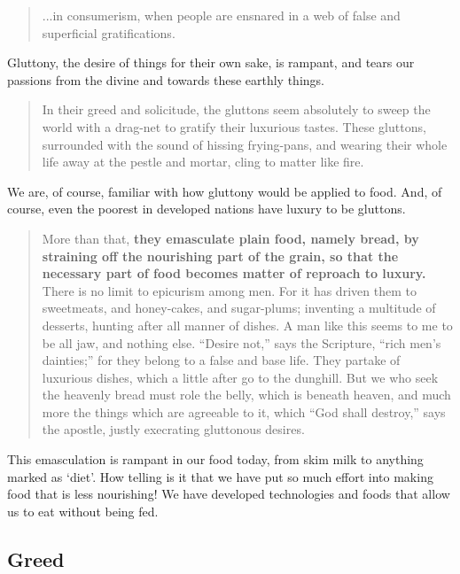 \documentclass[letterpaper]{article}
\begin{document}
\begin{quote}
  ...in consumerism, when people are ensnared in a web of false and superficial gratifications.
\end{quote}

Gluttony, the desire of things for their own sake, is rampant, and tears our passions from the divine and towards these earthly things.

\begin{quote}
  In their greed and solicitude, the gluttons seem absolutely to sweep the world with a drag-net to gratify their luxurious tastes. These gluttons, surrounded with the sound of hissing frying-pans, and wearing their whole life away at the pestle and mortar, cling to matter like fire. 
\end{quote}

We are, of course, familiar with how gluttony would be applied to food. And, of course, even the poorest in developed nations have luxury to be gluttons.

\begin{quote}
  More than that, \textbf{they emasculate plain food, namely bread, by straining off the nourishing part of the grain, so that the necessary part of food becomes matter of reproach to luxury.} There is no limit to epicurism among men. For it has driven them to sweetmeats, and honey-cakes, and sugar-plums; inventing a multitude of desserts, hunting after all manner of dishes. A man like this seems to me to be all jaw, and nothing else. ``Desire not,'' says the Scripture, ``rich men’s dainties;'' for they belong to a false and base life. They partake of luxurious dishes, which a little after go to the dunghill. But we who seek the heavenly bread must role the belly, which is beneath heaven, and much more the things which are agreeable to it, which “God shall destroy,” says the apostle, justly execrating gluttonous desires.
\end{quote}

This emasculation is rampant in our food today, from skim milk to anything marked as `diet'. How telling is it that we have put so much effort into making food that is less nourishing! We have developed technologies and foods that allow us to eat without being fed.

\subsection{Greed}
\end{document}
